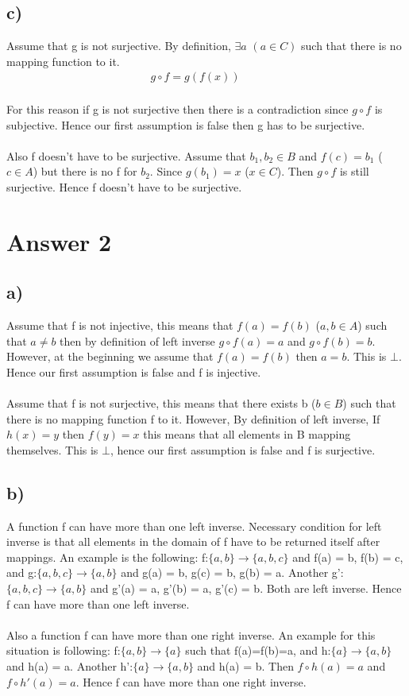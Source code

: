 \documentclass[12pt]{article}
\begin{document}
\subsection*{c)}
Assume that g is not surjective. By definition, $\exists a $ $(a \in C)$ such that there is no mapping function to it. 
\begin{equation} 
\label{eq3}
\begin{split}
    g \circ f = g(f(x))\quad   \quad
\end{split}
\end{equation} \\
For this reason if g is not surjective then there is a contradiction since $g \circ f$ is subjective. Hence our first assumption is false then g has to be surjective. \\ \\
Also f doesn't have to be surjective. Assume that $b_1,b_2 \in B$ and $f(c) = b_1$ ($c\in A$) but there is no f for $b_2$. Since $g(b_1) = x$ ($x\in C$). Then $g \circ f$ is still surjective. Hence f doesn't have to be surjective. 

\section*{Answer 2}
\subsection*{a)}
Assume that f is not injective, this means that $f(a)=f(b)$ ($a,b \in A$) such that $a\neq b$ then by definition of left inverse $g \circ f(a) = a$ and $g \circ f(b) = b$. However, at the beginning we assume that $f(a)=f(b)$ then $a = b$. This is $\bot$. Hence our first assumption is false and f is injective. \\ \\
Assume that f is not surjective, this means that there exists b ($b \in B$) such that there is no mapping function f to it. However, By definition of left inverse, If $h(x) = y$ then $f(y) = x$ this means that all elements in B mapping themselves. This is $\bot$, hence our first assumption is false and f is surjective.
\subsection*{b)}
A function f can have more than one left inverse. Necessary condition for left inverse is  that all elements in the domain of f have to be returned itself after mappings. An example is the following: f:$\{a,b\} \to \{a,b,c\}$ and f(a) = b, f(b) = c, and g:$\{a,b,c\} \to \{a,b\}$ and g(a) = b, g(c) = b, g(b) = a. Another g':$\{a,b,c\} \to \{a,b\}$ and g'(a) = a, g'(b) = a, g'(c) = b. Both are left inverse. Hence f can have more than one left inverse. \\ \\
Also a function f can have more than one right inverse. An example for this situation is following: f:$\{a,b\} \to \{a\}$ such that f(a)=f(b)=a, and h:$\{a\} \to \{a,b\}$ and h(a) = a. Another h':$\{a\} \to \{a,b\}$ and h(a) = b. Then $f\circ h(a) = a$ and $f\circ h'(a) = a$. Hence f can have more than one right inverse.
\end{document}
